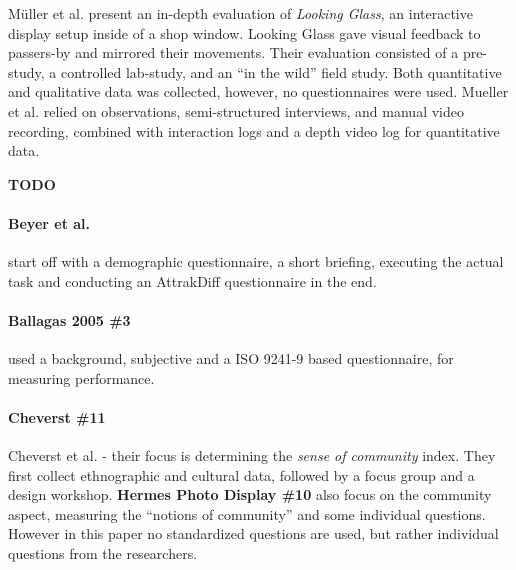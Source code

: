 	M{\"u}ller et al. \cite{Muller2012LookingGlass} present an in-depth evaluation of \textit{Looking Glass}, an interactive display setup inside of a shop window. Looking Glass gave visual feedback to passers-by and mirrored their movements. Their evaluation consisted of a pre-study, a controlled lab-study, and an ``in the wild'' field study. Both quantitative and qualitative data was collected, however, no questionnaires were used. Mueller et al. relied on observations, semi-structured interviews, and manual video recording, combined with interaction logs and a depth video log for quantitative data.





	\textbf{TODO}

	\paragraph{Beyer et al.} start off with a demographic questionnaire, a short briefing, executing the actual task and conducting an AttrakDiff questionnaire in the end.

	\paragraph{Ballagas 2005 \#3} used a background, subjective and a ISO 9241-9 based questionnaire, for measuring performance.

	\paragraph{Cheverst \#11} Cheverst et al. - their focus is determining the \textit{sense of community} index. They first collect ethnographic and cultural data, followed by a focus group and a design workshop.
		\textbf{Hermes Photo Display \#10} also focus on the community aspect, measuring the ``notions of community'' and some individual questions. However in this paper no standardized questions are used, but rather individual questions from the researchers.





